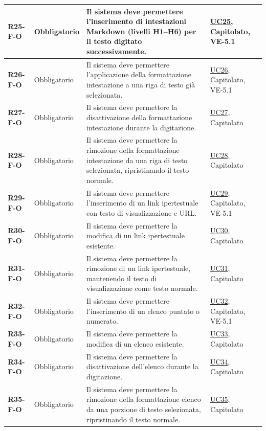 \begin{longtable}{|p{2.5cm}|p{2.2cm}|p{6.8cm}|p{2.7cm}|}
	\textbf{R25-F-O} & Obbligatorio & Il sistema deve permettere l'inserimento di intestazioni Markdown (livelli H1--H6) per il testo digitato successivamente. & \hyperlink{uc25}{UC25}, Capitolato, VE-5.1 \\ \hline
	\textbf{R26-F-O} & Obbligatorio & Il sistema deve permettere l'applicazione della formattazione intestazione a una riga di testo già selezionata. & \hyperlink{uc26}{UC26}, Capitolato, VE-5.1 \\ \hline
	\textbf{R27-F-O} & Obbligatorio & Il sistema deve permettere la disattivazione della formattazione intestazione durante la digitazione. & \hyperlink{uc27}{UC27}, Capitolato \\ \hline
	\textbf{R28-F-O} & Obbligatorio & Il sistema deve permettere la rimozione della formattazione intestazione da una riga di testo selezionata, ripristinando il testo normale. & \hyperlink{uc28}{UC28}, Capitolato \\ \hline
	\textbf{R29-F-O} & Obbligatorio & Il sistema deve permettere l'inserimento di un link ipertestuale con testo di visualizzazione e URL. & \hyperlink{uc29}{UC29}, Capitolato, VE-5.1 \\ \hline
	\textbf{R30-F-O} & Obbligatorio & Il sistema deve permettere la modifica di un link ipertestuale esistente. & \hyperlink{uc30}{UC30}, Capitolato \\ \hline
	\textbf{R31-F-O} & Obbligatorio & Il sistema deve permettere la rimozione di un link ipertestuale, mantenendo il testo di visualizzazione come testo normale. & \hyperlink{uc31}{UC31}, Capitolato \\ \hline
	\textbf{R32-F-O} & Obbligatorio & Il sistema deve permettere l'inserimento di un elenco puntato o numerato. & \hyperlink{uc32}{UC32}, Capitolato, VE-5.1 \\ \hline
	\textbf{R33-F-O} & Obbligatorio & Il sistema deve permettere la modifica di un elenco esistente. & \hyperlink{uc33}{UC33}, Capitolato \\ \hline
	\textbf{R34-F-O} & Obbligatorio & Il sistema deve permettere la disattivazione dell'elenco durante la digitazione. & \hyperlink{uc34}{UC34}, Capitolato \\ \hline
	\textbf{R35-F-O} & Obbligatorio & Il sistema deve permettere la rimozione della formattazione elenco da una porzione di testo selezionata, ripristinando il testo normale. & \hyperlink{uc35}{UC35}, Capitolato \\ \hline


\end{longtable}

